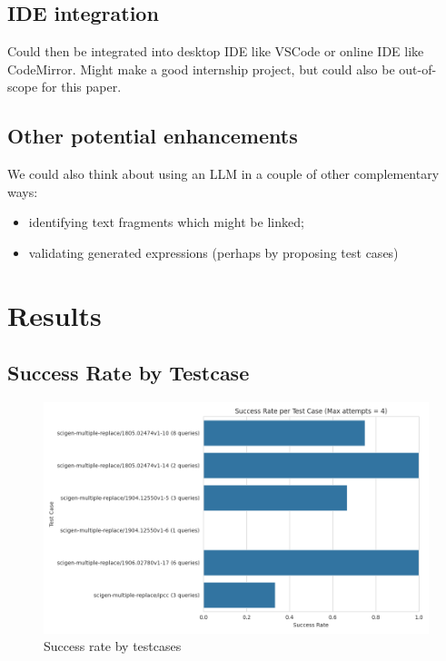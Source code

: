 \subsection{IDE integration}\label{subsec:ide-integration}

Could then be integrated into desktop IDE like VSCode or online IDE like CodeMirror. Might make a good
internship project, but could also be out-of-scope for this paper.

\subsection{Other potential enhancements}\label{subsec:other-potential-enhancements}

We could also think about using an LLM in a couple of other complementary ways:
\begin{itemize}
\item identifying text fragments which might be linked;
\item validating generated expressions (perhaps by proposing test cases)
\end{itemize}


\section{Results}
\label{sec:results}

\subsection{Success Rate by Testcase}
\label{subsec:success_rate_by_test_case}

\begin{figure}[!h]
    \centering
    \includegraphics[width=0.95\linewidth]{fig/success_rate_by_test_case}
    \caption{Success rate by testcases}\label{fig:success_rate_by_test_case}
\end{figure}



